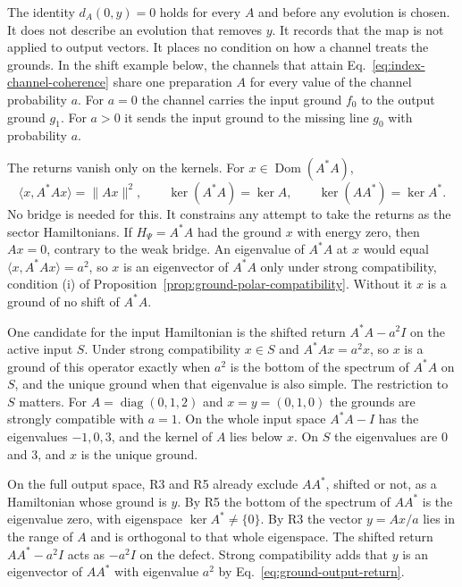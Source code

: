 \documentclass[11pt]{article}
\theoremstyle{definition}
\begin{document}
The identity $d_A(0,y)=0$ holds for every $A$ and before any evolution is chosen. It does not describe an evolution that removes $y$. It records that the map is not applied to output vectors. It places no condition on how a channel treats the grounds. In the shift example below, the channels that attain Eq.~\eqref{eq:index-channel-coherence} share one preparation $A$ for every value of the channel probability $a$. For $a=0$ the channel carries the input ground $f_0$ to the output ground $g_1$. For $a>0$ it sends the input ground to the missing line $g_0$ with probability $a$.

The returns vanish only on the kernels. For $x\in\operatorname{Dom}(A^*A)$,
\begin{equation}
 \langle x,A^*Ax\rangle=\|Ax\|^2,\qquad
 \ker(A^*A)=\ker A,\qquad \ker(AA^*)=\ker A^* .
 \label{eq:return-kernels}
\end{equation}
No bridge is needed for this. It constrains any attempt to take the returns as the sector Hamiltonians. If $H_\Psi=A^*A$ had the ground $x$ with energy zero, then $Ax=0$, contrary to the weak bridge. An eigenvalue of $A^*A$ at $x$ would equal $\langle x,A^*Ax\rangle=a^2$, so $x$ is an eigenvector of $A^*A$ only under strong compatibility, condition (i) of Proposition~\ref{prop:ground-polar-compatibility}. Without it $x$ is a ground of no shift of $A^*A$.

One candidate for the input Hamiltonian is the shifted return $A^*A-a^2I$ on the active input $S$. Under strong compatibility $x\in S$ and $A^*Ax=a^2x$, so $x$ is a ground of this operator exactly when $a^2$ is the bottom of the spectrum of $A^*A$ on $S$, and the unique ground when that eigenvalue is also simple. The restriction to $S$ matters. For $A=\operatorname{diag}(0,1,2)$ and $x=y=(0,1,0)$ the grounds are strongly compatible with $a=1$. On the whole input space $A^*A-I$ has the eigenvalues $-1,0,3$, and the kernel of $A$ lies below $x$. On $S$ the eigenvalues are $0$ and $3$, and $x$ is the unique ground.

On the full output space, R3 and R5 already exclude $AA^*$, shifted or not, as a Hamiltonian whose ground is $y$. By R5 the bottom of the spectrum of $AA^*$ is the eigenvalue zero, with eigenspace $\ker A^*\ne\{0\}$. By R3 the vector $y=Ax/a$ lies in the range of $A$ and is orthogonal to that whole eigenspace. The shifted return $AA^*-a^2I$ acts as $-a^2I$ on the defect. Strong compatibility adds that $y$ is an eigenvector of $AA^*$ with eigenvalue $a^2$ by Eq.~\eqref{eq:ground-output-return}.
\end{document}
